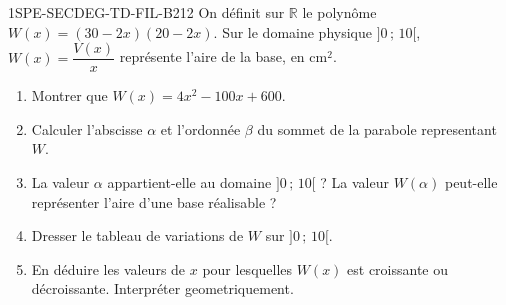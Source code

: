 \begin{exercice}{1SPE-SECDEG-TD-FIL-B}{2}{12}
On définit sur $\mathbb{R}$ le polynôme $W(x)=(30-2x)(20-2x)$.
Sur le domaine physique $]0\,;\,10[$, $W(x)=\dfrac{V(x)}{x}$ représente
l'aire de la base, en cm$^2$.
\begin{enumerate}
  \item Montrer que $W(x) = 4x^2 - 100x + 600$.
  \item Calculer l'abscisse $\alpha$ et l'ordonnée $\beta$ du sommet de la parabole representant $W$.
  \item La valeur $\alpha$ appartient-elle au domaine $]0\,;\,10[$ ?
    La valeur $W(\alpha)$ peut-elle représenter l'aire d'une base réalisable ?
  \item Dresser le tableau de variations de $W$ sur $]0\,;\,10[$.
  \item En déduire les valeurs de $x$ pour lesquelles $W(x)$ est croissante ou décroissante.
    Interpréter geometriquement.
\end{enumerate}
\end{exercice}


